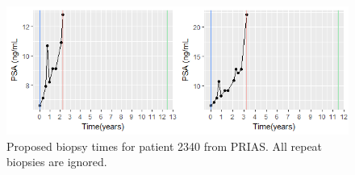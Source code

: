 \begin{figure}
\centerline{\includegraphics[width=\columnwidth]{images/prias_demo/case_2340_nobiopsy.png}}
\caption{Proposed biopsy times for patient 2340 from PRIAS. All repeat biopsies are ignored.}
\label{fig : prias_demo_pid_2340_no_biopsy}
\end{figure}